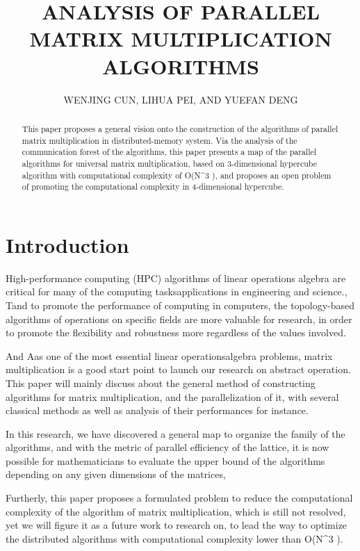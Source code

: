 \documentclass{amsart}
\title{ANALYSIS OF PARALLEL MATRIX MULTIPLICATION ALGORITHMS}
\author{WENJING CUN, LIHUA PEI, AND YUEFAN DENG}
\theoremstyle{definition}
\theoremstyle{remark}
\numberwithin{equation}{section}
\begin{document}
	\maketitle

	\begin{abstract}
		
		This paper proposes a general vision onto the construction of the algorithms of parallel matrix multiplication in distributed-memory system. Via the analysis of the communication forest of the algorithms, this paper presents a map of the parallel algorithms for universal matrix multiplication, based on 3-dimensional hypercube algorithm with computational complexity of {O(N^3 )}, and proposes an open problem of promoting the computational complexity in 4-dimensional hypercube. 
		
	\end{abstract}




	\section{Introduction}

	High-performance computing (HPC) algorithms of linear operations algebra are critical for many of the computing tasksapplications in engineering and science., Tand to promote the performance of computing in computers, the topology-based algorithms of operations on specific fields are more valuable for research, in order to promote the flexibility and robustness more regardless of the values involved. 
	
	And Aas one of the most essential linear operationsalgebra problems, matrix multiplication is a good start point to launch our research on abstract operation. This paper will mainly discuss about the general method of constructing algorithms for matrix multiplication, and the parallelization of it, with several classical methods as well as analysis of their performances for instance.
	
	In this research, we have discovered a general map to organize the family of the algorithms, and with the metric of parallel efficiency of the lattice, it is now possible for mathematicians to evaluate the upper bound of the algorithms depending on any given dimensions of the matrices, 
	
	Furtherly, this paper proposes a formulated problem to reduce the computational complexity of the algorithm of matrix multiplication, which is still not resolved, yet we will figure it as a future work to research on, to lead the way to optimize the distributed algorithms with computational complexity lower than O(N^3 ).
	
\end{document}
